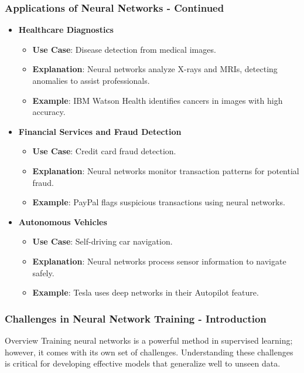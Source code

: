 \documentclass[aspectratio=169]{beamer}
\begin{document}
\begin{frame}[fragile]
    \frametitle{Applications of Neural Networks - Continued}
    
    \begin{itemize}
        \item \textbf{Healthcare Diagnostics}
            \begin{itemize}
                \item \textbf{Use Case}: Disease detection from medical images.
                \item \textbf{Explanation}: Neural networks analyze X-rays and MRIs, detecting anomalies to assist professionals.
                \item \textbf{Example}: IBM Watson Health identifies cancers in images with high accuracy.
            \end{itemize}

        \item \textbf{Financial Services and Fraud Detection}
            \begin{itemize}
                \item \textbf{Use Case}: Credit card fraud detection.
                \item \textbf{Explanation}: Neural networks monitor transaction patterns for potential fraud.
                \item \textbf{Example}: PayPal flags suspicious transactions using neural networks.
            \end{itemize}

        \item \textbf{Autonomous Vehicles}
            \begin{itemize}
                \item \textbf{Use Case}: Self-driving car navigation. 
                \item \textbf{Explanation}: Neural networks process sensor information to navigate safely.
                \item \textbf{Example}: Tesla uses deep networks in their Autopilot feature.
            \end{itemize}
    \end{itemize}
\end{frame}

\begin{frame}[fragile]
    \frametitle{Challenges in Neural Network Training - Introduction}
    \begin{block}{Overview}
        Training neural networks is a powerful method in supervised learning; however, it comes with its own set of challenges. Understanding these challenges is critical for developing effective models that generalize well to unseen data.
    \end{block}
\end{frame}
\end{document}
